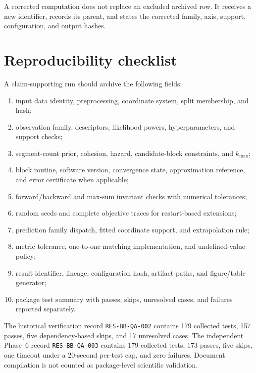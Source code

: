 A corrected computation does not replace an excluded archived row. It receives a new identifier, records its parent, and states the corrected family, axis, support, configuration, and output hashes.

\section{Reproducibility checklist}
\label{app:reproducibility}

A claim-supporting run should archive the following fields:
\begin{enumerate}
\item input data identity, preprocessing, coordinate system, split membership, and hash;
\item observation family, descriptors, likelihood powers, hyperparameters, and support checks;
\item segment-count prior, cohesion, hazard, candidate-block constraints, and $k_{\max}$;
\item block routine, software version, convergence state, approximation reference, and error certificate when applicable;
\item forward/backward and max-sum invariant checks with numerical tolerances;
\item random seeds and complete objective traces for restart-based extensions;
\item prediction family dispatch, fitted coordinate support, and extrapolation rule;
\item metric tolerance, one-to-one matching implementation, and undefined-value policy;
\item result identifier, lineage, configuration hash, artifact paths, and figure/table generator;
\item package test summary with passes, skips, unresolved cases, and failures reported separately.
\end{enumerate}

The historical verification record \texttt{RES-BB-QA-002} contains 179 collected tests, 157 passes, five dependency-based skips, and 17 unresolved cases. The independent Phase~6 record \texttt{RES-BB-QA-003} contains 179 collected tests, 173 passes, five skips, one timeout under a 20-second per-test cap, and zero failures. Document compilation is not counted as package-level scientific validation.

